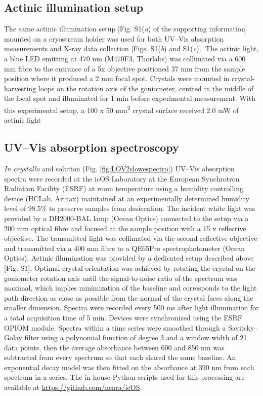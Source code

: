 \subsection{Actinic illumination setup}
The same actinic illumination setup [Fig. S1(\textit{a}) of the supporting information] mounted on a cryostream holder was used for both UV–Vis absorption measurements and X-ray data collection [Figs. S1(\textit{b}) and S1(\textit{c})]. The actinic light, a blue LED emitting at 470 nm (M470F3, Thorlabs) was collimated via a 600 mm fibre to the entrance of a 5x objective positioned 37 mm from the sample position where it produced a 2 mm focal spot. Crystals were mounted in crystal-harvesting loops on the rotation axis of the goniometer, centred in the middle of the focal spot and illuminated for 1 min before experimental measurement. With this experimental setup, a 100 x 50 mm\textsuperscript{2} crystal surface received 2.0 mW of actinic light
\subsection{UV–Vis absorption spectroscopy}
\textit{In crystallo} and solution (Fig. \ref{fig:LOV2slowespectro}) UV–Vis absorption spectra were recorded at the icOS Laboratory at the European Synchrotron Radiation Facility (ESRF) \parencite{vonstettenCrystalloOpticalSpectroscopy2015} at room temperature using a humidity controlling device (HCLab, Arinax) \parencite{sanchez-weatherbyImprovingDiffractionHumidity2009} maintained at an experimentally determined humidity level of 98.5\% to preserve samples from desiccation. The incident white light was provided by a DH2000-BAL lamp (Ocean Optics) connected to the setup via a 200 mm optical fibre and focused at the sample position with a 15 x reflective objective. The transmitted light was collimated via the second reflective objective and transmitted via a 400 mm fibre to a QE65Pro spectrophotometer (Ocean Optics). Actinic illumination was provided by a dedicated setup described above [Fig. S1]. Optimal crystal orientation was achieved by rotating the crystal on the goniometer rotation axis until the signal-to-noise ratio of the spectrum was maximal, which implies minimization of the baseline and corresponds to the light path direction as close as possible from the normal of the crystal faces along the smaller dimension. Spectra were recorded every 500 ms after light illumination for a total acquisition time of 5 min. Devices were synchronized using the ESRF OPIOM module. Spectra within a time series were smoothed through a Savitsky–Golay filter using a polynomial function of degree 3 and a window width of 21 data points, then the average absorbance between 600 and 850 nm was subtracted from every spectrum so that each shared the same baseline. An exponential decay model was then fitted on the absorbance at 390 nm from each spectrum in a series. The in-house Python scripts used for this processing are available at \href{https://github.com/ncara/icOS}{https://github.com/ncara/icOS}.
